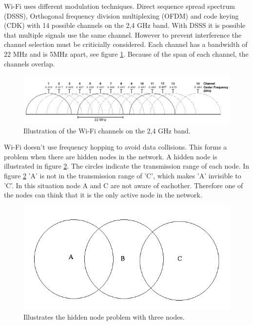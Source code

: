 \documentclass[10pt,a4paper]{article}
\begin{document}
Wi-Fi uses different modulation techniques. Direct sequence spread spectrum (DSSS), Orthogonal frequency division multiplexing (OFDM) and code keying (CDK) with 14 possible channels on the 2,4 GHz band. With DSSS it is possible that multiple signals use the same channel. However to prevent interference the channel selection must be criticially considered. Each channel has a bandwidth of 22 MHz and is 5MHz apart, see figure \ref{fig:wifichannels}. \cite{combook} Because of the span of each channel, the channels overlap.

\begin{figure}[H]
   \centering
   \includegraphics[width=1\textwidth]{wifichannels}
   \caption{Illustration of the Wi-Fi channels on the 2,4 GHz band. \cite{wifichannels}}
   \label{fig:wifichannels}
\end{figure}

Wi-Fi doesn't use frequency hopping to avoid data collisions. This forms a problem when there are hidden nodes in the network. A hidden node is illustrated in figure \ref{fig:hiddennode}. The circles indicate the transmission range of each node. In figure \ref{fig:hiddennode} 'A' is not in the transmission range of 'C', which makes 'A' invisible to 'C'. In this situation node A and C are not aware of eachother. Therefore one of the nodes can think that it is the only active node in the network.

\begin{figure}[H]
   \centering
   \includegraphics[width=1\textwidth]{hiddennodeproblem}
   \caption{Illustrates the hidden node problem with three nodes.}
   \label{fig:hiddennode}
\end{figure}
\end{document}
